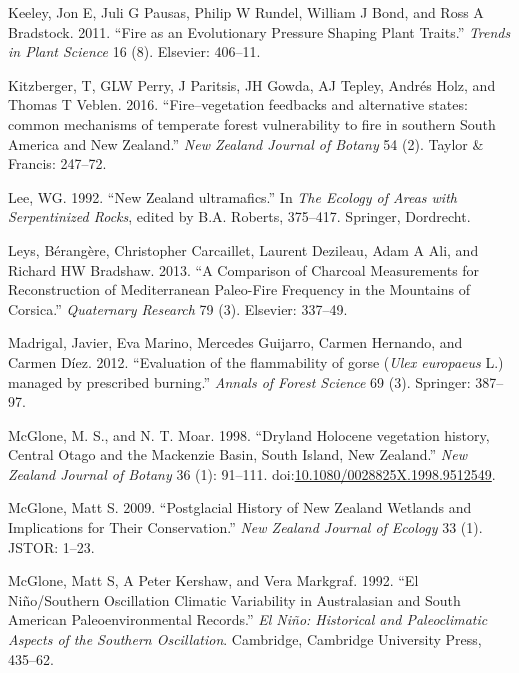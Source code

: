 \hypertarget{ref-keeley2011fire}{}
Keeley, Jon E, Juli G Pausas, Philip W Rundel, William J Bond, and Ross
A Bradstock. 2011. ``Fire as an Evolutionary Pressure Shaping Plant
Traits.'' \emph{Trends in Plant Science} 16 (8). Elsevier: 406--11.

\hypertarget{ref-kitzberger2016fire}{}
Kitzberger, T, GLW Perry, J Paritsis, JH Gowda, AJ Tepley, Andrés Holz,
and Thomas T Veblen. 2016. ``Fire--vegetation feedbacks and alternative
states: common mechanisms of temperate forest vulnerability to fire in
southern South America and New Zealand.'' \emph{New Zealand Journal of
Botany} 54 (2). Taylor \& Francis: 247--72.

\hypertarget{ref-lee1992new}{}
Lee, WG. 1992. ``New Zealand ultramafics.'' In \emph{The Ecology of
Areas with Serpentinized Rocks}, edited by B.A. Roberts, 375--417.
Springer, Dordrecht.

\hypertarget{ref-leys2013}{}
Leys, Bérangère, Christopher Carcaillet, Laurent Dezileau, Adam A Ali,
and Richard HW Bradshaw. 2013. ``A Comparison of Charcoal Measurements
for Reconstruction of Mediterranean Paleo-Fire Frequency in the
Mountains of Corsica.'' \emph{Quaternary Research} 79 (3). Elsevier:
337--49.

\hypertarget{ref-madrigal2012evaluation}{}
Madrigal, Javier, Eva Marino, Mercedes Guijarro, Carmen Hernando, and
Carmen Díez. 2012. ``Evaluation of the flammability of gorse (\emph{Ulex
europaeus} L.) managed by prescribed burning.'' \emph{Annals of Forest
Science} 69 (3). Springer: 387--97.

\hypertarget{ref-McGlone1998}{}
McGlone, M. S., and N. T. Moar. 1998. ``Dryland Holocene vegetation
history, Central Otago and the Mackenzie Basin, South Island, New
Zealand.'' \emph{New Zealand Journal of Botany} 36 (1): 91--111.
doi:\href{https://doi.org/10.1080/0028825X.1998.9512549}{10.1080/0028825X.1998.9512549}.

\hypertarget{ref-mcglone2009postglacial}{}
McGlone, Matt S. 2009. ``Postglacial History of New Zealand Wetlands and
Implications for Their Conservation.'' \emph{New Zealand Journal of
Ecology} 33 (1). JSTOR: 1--23.

\hypertarget{ref-mcglone1992nino}{}
McGlone, Matt S, A Peter Kershaw, and Vera Markgraf. 1992. ``El
Niño/Southern Oscillation Climatic Variability in Australasian and South
American Paleoenvironmental Records.'' \emph{El Niño: Historical and
Paleoclimatic Aspects of the Southern Oscillation}. Cambridge, Cambridge
University Press, 435--62.

